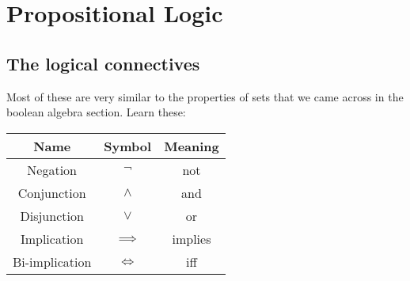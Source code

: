 
\section{Propositional Logic}

\subsection{The logical connectives}

Most of these are very similar to the properties of sets that we came across in
the boolean algebra section. Learn these:



\begin{center}
	\begin{tabular}{|c|c|c|}
		\hline
		Name & Symbol & Meaning\\ \hline
		Negation		&	$\neg$		& not\\
		Conjunction		&	$\wedge$	& and\\
		Disjunction		&	$\vee$		& or\\
		Implication		&	$\implies$	& implies\\
		Bi-implication	&	$\iff$		& iff\\
		\hline
	\end{tabular}
\end{center}

